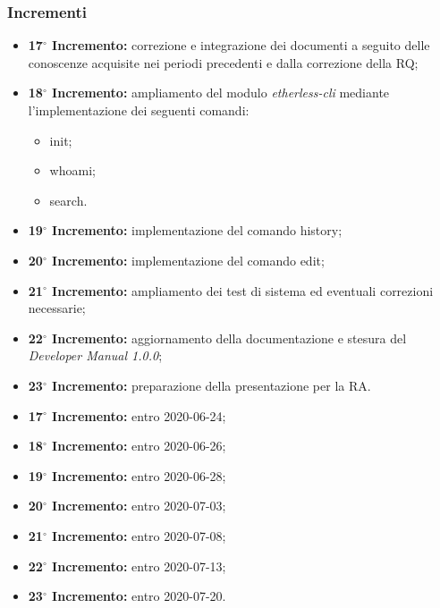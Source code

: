 	\subsubsection{Incrementi}
			\begin{itemize}
				\item \textbf{17$^{\circ}$ Incremento:} correzione e integrazione dei documenti a seguito delle conoscenze acquisite nei periodi precedenti e dalla correzione della RQ;
				\item \textbf{18$^{\circ}$ Incremento:} ampliamento del modulo \textit{etherless-cli} mediante l'implementazione dei seguenti comandi:
					\begin{itemize}
						\item init;
						\item whoami;
						\item search.
					\end{itemize}
				\item \textbf{19$^{\circ}$ Incremento:} implementazione del comando history;
				\item \textbf{20$^{\circ}$ Incremento:} implementazione del comando edit;
				\item \textbf{21$^{\circ}$ Incremento:} ampliamento dei test di sistema ed eventuali correzioni necessarie;
				\item \textbf{22$^{\circ}$ Incremento:} aggiornamento della documentazione e stesura del \textit{Developer Manual 1.0.0};
				\item \textbf{23$^{\circ}$ Incremento:} preparazione della presentazione per la RA.
			\end{itemize}
			\begin{itemize}
				\item \textbf{17$^{\circ}$ Incremento:} entro 2020-06-24;
				\item \textbf{18$^{\circ}$ Incremento:} entro 2020-06-26;
				\item \textbf{19$^{\circ}$ Incremento:} entro 2020-06-28;
				\item \textbf{20$^{\circ}$ Incremento:} entro 2020-07-03;
				\item \textbf{21$^{\circ}$ Incremento:} entro 2020-07-08;
				\item \textbf{22$^{\circ}$ Incremento:} entro 2020-07-13;
				\item \textbf{23$^{\circ}$ Incremento:} entro 2020-07-20.
			\end{itemize}

